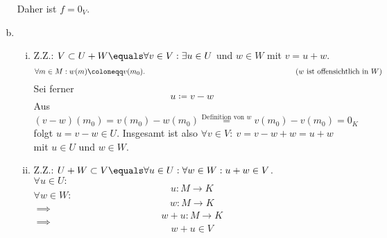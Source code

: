 \documentclass{article}
\begin{document}
\begin{enumerate}[(a)]
	Daher ist $f = 0_V$.
	\item \begin{enumerate}[i)]
		\item Z.Z.: $V\subset U+W \equals \forall v\in V: \exists u\in U$ und $w\in W$ mit $v = u + w$.
		\[\forall m\in M: w(m)\coloneqq v(m_0).\hspace*{7cm} (\text{$w$ ist offensichtlich in $W$})\]
		Sei ferner 
		\[u\coloneqq v-w\]
		Aus $(v-w)(m_0) = v(m_0)- w(m_0) \overset{\text{Definition von $w$}}{=} v(m_0) - v(m_0) = 0_K$ folgt $u = v-w \in U$.
		Insgesamt ist also $\forall v\in V:\ v = v-w + w = u + w$ mit $u\in U$ und $w\in W$.
		\item Z.Z.: $U+W \subset V \equals \forall u\in U:\forall w\in W: u+w\in V$.\\
		$\forall u\in U:$
		\[u: M\to K\]
		$\forall w\in W:$
		\[w: M\to K\]
		$\implies$
		\[w+u: M\to K\]
		$\implies$
		\[w+u \in V\]
	\end{enumerate}
	\end{enumerate}
\end{document}
